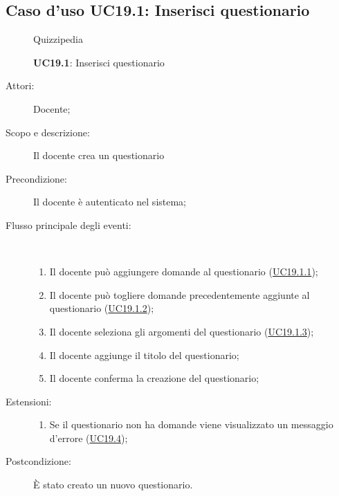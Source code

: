 \subsection{Caso d'uso UC19.1: Inserisci questionario}
	\begin{figure}[H]
		\centering
		\begin{resizedtikzpicture}{\textwidth}
		\begin{umlsystem}[x=0, fill=lightgray!20]{Quizzipedia}
		\end{umlsystem}
		\end{resizedtikzpicture}
		\caption{\textbf{UC19.1}: Inserisci questionario}
		\label{UC19.1}
	\end{figure}
\begin{description}
\item[Attori:] Docente;
\item[Scopo e descrizione:] Il docente crea un questionario
      \item[Precondizione:] Il docente è autenticato nel sistema;

        \item[Flusso principale degli eventi:] \ 
 \begin{enumerate}
          \item Il docente può aggiungere domande al questionario (\hyperlink{UC19.1.1}{UC19.1.1});
          \item Il docente può togliere domande precedentemente aggiunte al questionario (\hyperlink{UC19.1.2}{UC19.1.2});
          \item Il docente seleziona gli argomenti del questionario (\hyperlink{UC19.1.3}{UC19.1.3});
          \item Il docente aggiunge il titolo del questionario;
          \item Il docente conferma la creazione del questionario;

      \end{enumerate}
    \item[Estensioni:]
      \begin{enumerate}
          \item Se il questionario non ha domande viene visualizzato un messaggio d'errore (\hyperlink{UC19.4}{UC19.4});

      \end{enumerate}
    \item[Postcondizione:] È stato creato un nuovo questionario.
  \end{description}
\hypertarget{UC19.1.1}{}
